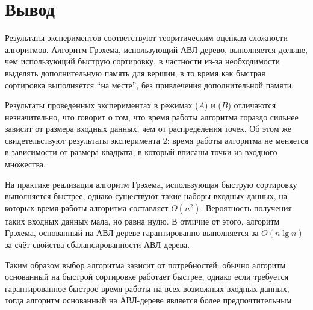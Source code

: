 \section{Вывод}
Результаты экспериментов соответствуют теоритическим оценкам сложности алгоритмов. Алгоритм Грэхема, использующий АВЛ-дерево, выполняется дольше, чем использующий быструю сортировку, в частности из-за необходимости выделять дополнительную память для вершин, в то время как быстрая сортировка выполняется \textquotedblleft{}на месте\textquotedblright{}, без привлечения дополнительной памяти. 

Результаты проведенных экспериментах в режимах ($A$) и ($B$) отличаются незначительно, что говорит о том, что время работы алгоритма гораздо сильнее зависит от размера входных данных, чем от распределения точек.
Об этом же свидетельствуют результаты эксперимента 2: время работы алгоритма не меняется в зависимости от размера квадрата, в который вписаны точки из входного множества.

На практике реализация алгоритм Грэхема, использующая быструю сортировку выполняется быстрее, однако существуют такие наборы входных данных, на которых время работы алгоритма составляет $O(n^2)$. Вероятность получения таких входных данных мала, но равна нулю. В отличие от этого, алгоритм Грэхема, основанный на АВЛ-дереве гарантированно выполняется за $O(n\lg n)$ за счёт свойства сбалансированности АВЛ-дерева.

Таким образом выбор алгоритма зависит от потребностей: обычно алгоритм основанный на быстрой сортировке работает быстрее, однако если требуется гарантированное быстрое время работы на всех возможных входных данных, тогда алгоритм основанный на АВЛ-дереве является более предпочтительным.

\newpage
